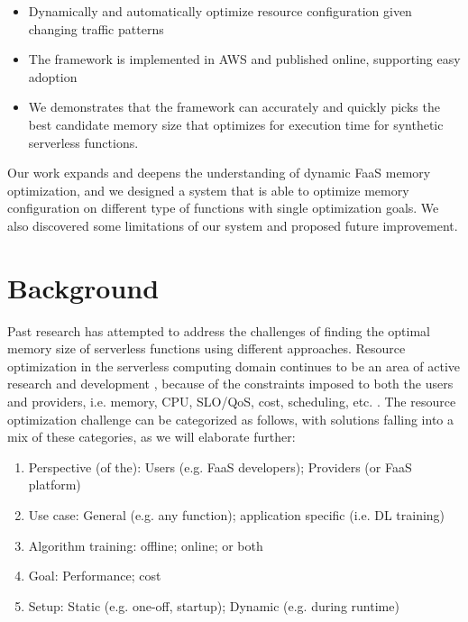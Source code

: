 \documentclass[conference]{IEEEtran}
\begin{document}
\begin{itemize}
    \item Dynamically and automatically optimize resource configuration given changing traffic patterns
    \item The framework is implemented in AWS and published online, supporting easy adoption
    \item We demonstrates that the framework can accurately and quickly picks the best candidate memory size that optimizes for execution time for synthetic serverless functions.
\end{itemize}

Our work expands and deepens the understanding of dynamic FaaS memory optimization, and we designed a system that is able to optimize memory configuration on different type of functions with single optimization goals. We also discovered some limitations of our system and proposed future improvement.

\section{Background}

Past research has attempted to address the challenges of finding the optimal memory size of serverless functions using different approaches. Resource optimization in the serverless computing domain continues to be an area of active research and development \cite{10.1145/3587249, 10.1145/3406011, 9756233}, because of the constraints imposed to both the users and providers, i.e. memory, CPU, SLO/QoS, cost, scheduling, etc. \cite{10181224, 10.1145/3542929.3563469, 9860980, 9460548, 10.1145/3429880.3430099}. The resource optimization challenge can be categorized as follows, with solutions falling into a mix of these categories, as we will elaborate further:

\begin{enumerate}
    \item Perspective (of the): Users (e.g. FaaS developers); Providers (or FaaS platform)
    \item Use case: General (e.g. any function); application specific (i.e. DL training)
    \item Algorithm training: offline; online; or both
    \item Goal: Performance; cost
    \item Setup: Static (e.g. one-off, startup); Dynamic (e.g. during runtime)
\end{enumerate}
\end{document}
